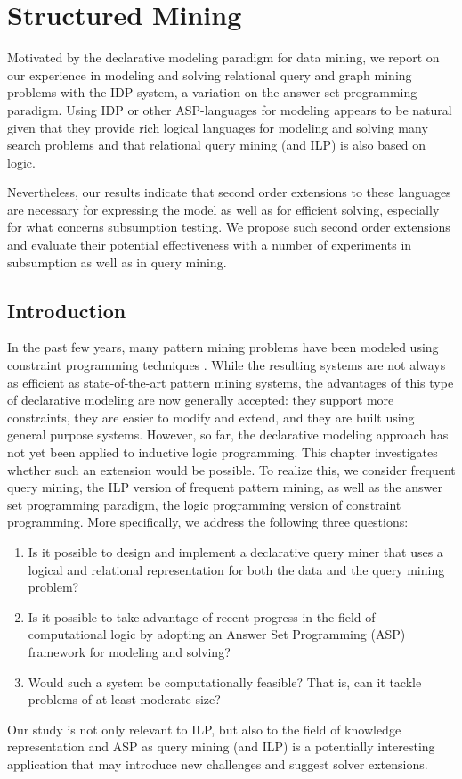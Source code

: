 \chapter{Structured Mining}\label{ch:StructuredMining}
  Motivated by the declarative modeling paradigm for data mining, we report on our experience in modeling and solving relational query and graph mining problems with the IDP system, a variation on the answer set programming paradigm. Using IDP or other ASP-languages for modeling appears to be natural given that they provide rich logical languages for modeling and solving many search problems and that relational query mining (and ILP) is also based on logic.

  Nevertheless, our results indicate that second order extensions to these languages are necessary for expressing the model as well as for efficient solving, especially for what concerns subsumption testing. We propose such second order extensions and evaluate their potential effectiveness with a number of experiments in subsumption as well as in query mining.




\section{Introduction}
\label{sec:intro}
In the past few years, many pattern mining problems have been modeled using constraint programming techniques \parencite{guns_framework}.
While the resulting systems are not always as efficient as state-of-the-art pattern mining systems,
the advantages of this type of declarative modeling are  now generally accepted: they support more constraints,
they are easier to modify and extend, and they are built using general purpose systems.
However, so far, the declarative modeling approach has not yet been applied to inductive logic programming. This chapter investigates whether such 
an extension would be possible.  To realize this, we consider frequent query mining, the ILP version of frequent pattern mining, as well as the answer set programming paradigm, the logic programming version of constraint programming. 
More specifically, we address the following three questions: 

\begin{enumerate}
\item[\qone] Is it possible to design and implement a declarative query miner that uses a logical and relational representation for both the data and the query mining problem? 
\item[\qtwo] Is it possible to take advantage of recent progress in the field of computational logic by adopting an Answer Set Programming (ASP) \parencite{eiter} framework for modeling and solving? 
\item[\qthree] Would such a system be computationally feasible? That is, can it tackle problems of at least moderate size?
\end{enumerate}
Our study is not only relevant to ILP, but also to the field of knowledge representation and ASP
as query mining (and ILP) is a potentially interesting application 
that may introduce new challenges and suggest solver extensions. 

